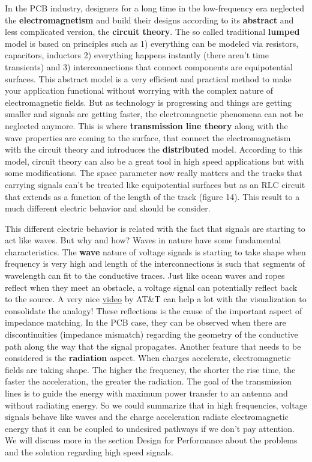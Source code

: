 \documentclass[final]{cubedoc}
\begin{document}
	In the PCB industry, designers for a long time in the low-frequency era neglected the \textbf{electromagnetism} and build their designs according to its \textbf{abstract} and less complicated version, the \textbf{circuit theory}. The so called traditional \textbf{lumped} model is based on principles such as 1) everything can be modeled via resistors, capacitors, inductors 2) everything happens instantly (there aren't time transients) and 3) interconnections that connect components are equipotential surfaces. This abstract model is a very efficient and practical method to make your application functional without worrying with the complex nature of electromagnetic fields. But as technology is progressing and things are getting smaller and signals are getting faster, the electromagnetic phenomena can not be neglected anymore. This is where \textbf{transmission line theory} along with the wave properties are coming to the surface, that connect the electromagnetism with the circuit theory and introduces the \textbf{distributed} model. According to this model, circuit theory can also be a great tool in high speed applications but with some modifications. The space parameter now really matters and the tracks that carrying signals can't be treated like equipotential surfaces but as an RLC circuit that extends as a function of the length of the track (figure 14). This result to a much different electric behavior and should be consider. 
	
	This different electric behavior is related with the fact that signals are starting to act like waves. But why and how?
	Waves in nature have some fundamental characteristics. The \textbf{wave} nature of voltage signals is starting to take shape when frequency is very high and length of the interconnections is such that segments of wavelength can fit to the conductive traces. Just like ocean waves and ropes reflect when they meet an obstacle, a voltage signal can potentially reflect back to the source. A very nice \href{https://www.youtube.com/watch?v=DovunOxlY1k}{video} by AT\&T can help a lot with the visualization to consolidate the analogy! These reflections is the cause of the important aspect of impedance matching. In the PCB case, they can be observed when there are discontinuities (impedance mismatch) regarding the geometry of the conductive path along the way that the signal propagates. Another feature that needs to be considered is the \textbf{radiation} aspect. When charges accelerate, electromagnetic fields are taking shape. The higher the frequency, the shorter the rise time, the faster the acceleration, the greater the radiation. The goal of the transmission lines is to guide the energy with maximum power transfer to an antenna and without radiating energy. So we could summarize that in high frequencies, voltage signals behave like waves and the charge acceleration radiate electromagnetic energy that it can be coupled to undesired pathways if we don't pay attention. We will discuss more in the section Design for Performance about the problems and the solution regarding high speed signals.
	
\end{document}
